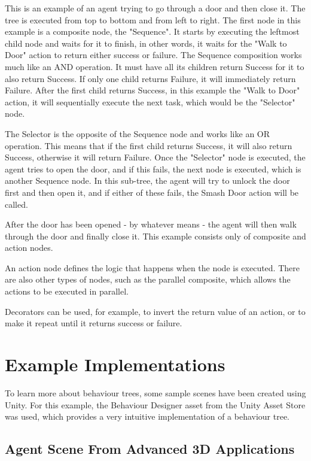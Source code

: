 This is an example of an agent trying to go through a door and then close it. The tree is executed from top to bottom and from left to right. The first node in this example is a composite node, the "Sequence". It starts by executing the leftmost child node and waits for it to finish, in other words, it waits for the "Walk to Door" action to return either success or failure. The Sequence composition works much like an AND operation. It must have all its children return Success for it to also return Success. If only one child returns Failure, it will immediately return Failure. After the first child returns Success, in this example the "Walk to Door" action, it will sequentially execute the next task, which would be the "Selector" node.

The Selector is the opposite of the Sequence node and works like an OR operation. This means that if the first child returns Success, it will also return Success, otherwise it will return Failure. Once the "Selector" node is executed, the agent tries to open the door, and if this fails, the next node is executed, which is another Sequence node. In this sub-tree, the agent will try to unlock the door first and then open it, and if either of these fails, the Smash Door action will be called.

After the door has been opened - by whatever means - the agent will then walk through the door and finally close it. This example consists only of composite and action nodes.

An action node defines the logic that happens when the node is executed. There are also other types of nodes, such as the parallel composite, which allows the actions to be executed in parallel.

Decorators can be used, for example, to invert the return value of an action, or to make it repeat until it returns success or failure.

\section{Example Implementations}
\label{sec:projectevolution_exampleimplementations}

To learn more about behaviour trees, some sample scenes have been created using Unity. For this example, the Behaviour Designer asset from the Unity Asset Store was used, which provides a very intuitive implementation of a behaviour tree.

\subsection{Agent Scene From Advanced 3D Applications}
\label{subsec:projectevolution_exampleimplementations_agentscenefromadvanced3dapplications}

